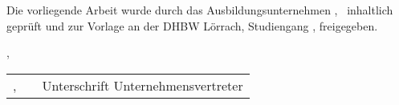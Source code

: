 
\thispagestyle{empty}


Die vorliegende Arbeit wurde durch das Ausbildungsunternehmen 
\firma, \firmenort~inhaltlich geprüft und zur Vorlage an der DHBW Lörrach, Studiengang \studiengang, freigegeben.

\firmenort, \datumAbgabe
\vspace{4em}

\begin{tabular}{p{}cp{}}
	\cline{1-1} \cline{3-3}
	\firmenort, \datumAbgabe & & Unterschrift Unternehmensvertreter 
\end{tabular}
